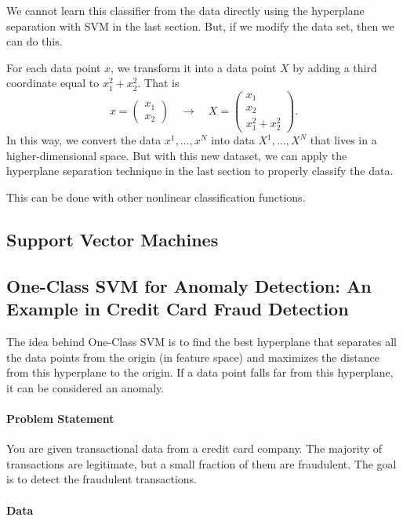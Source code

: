 We cannot learn this classifier from the data directly using the hyperplane separation with SVM in the last section.  But, if we modify the data set, then we can do this.  

For each data point $x$, we transform it into a data point $X$ by adding a third coordinate equal to $x_1^2 + x_2^2$.  That is 
\begin{equation}
x = \begin{pmatrix} x_1 \\ x_2 \end{pmatrix} \quad \rightarrow \quad X = \begin{pmatrix} x_1 \\ x_2 \\ x_1^2 + x_2^2 \end{pmatrix}.
\end{equation}
In this way, we convert the data $x^1, \dots, x^N$ into data $X^1, \dots, X^N$ that lives in a higher-dimensional space.  But with this new dataset, we can apply the hyperplane separation technique in the last section to properly classify the data.

This can be done with other nonlinear classification functions.  

\subsection{Support Vector Machines}





\subsection*{One-Class SVM for Anomaly Detection: An Example in Credit Card Fraud Detection}
The idea behind One-Class SVM is to find the best hyperplane that separates all the data points from the origin (in feature space) and maximizes the distance from this hyperplane to the origin. If a data point falls far from this hyperplane, it can be considered an anomaly.
\paragraph{Problem Statement}

You are given transactional data from a credit card company. The majority of transactions are legitimate, but a small fraction of them are fraudulent. The goal is to detect the fraudulent transactions.

\paragraph{Data}


